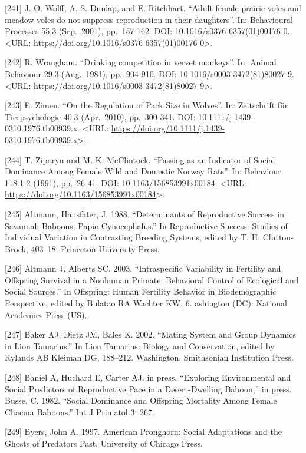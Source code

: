 \documentclass[
]{article}
\begin{document}
{[}241{]} J. O. Wolff, A. S. Dunlap, and E. Ritchhart. ``Adult female
prairie voles and meadow voles do not suppress reproduction in their
daughters''. In: Behavioural Processes 55.3 (Sep.~2001), pp.~157-162.
DOI: 10.1016/s0376-6357(01)00176-0. \textless URL:
\url{https://doi.org/10.1016/s0376-6357(01)00176-0}\textgreater.

{[}242{]} R. Wrangham. ``Drinking competition in vervet monkeys''. In:
Animal Behaviour 29.3 (Aug.~1981), pp.~904-910. DOI:
10.1016/s0003-3472(81)80027-9. \textless URL:
\url{https://doi.org/10.1016/s0003-3472(81)80027-9}\textgreater.

{[}243{]} E. Zimen. ``On the Regulation of Pack Size in Wolves''. In:
Zeitschrift für Tierpsychologie 40.3 (Apr.~2010), pp.~300-341. DOI:
10.1111/j.1439-0310.1976.tb00939.x. \textless URL:
\url{https://doi.org/10.1111/j.1439-0310.1976.tb00939.x}\textgreater.

{[}244{]} T. Ziporyn and M. K. McClintock. ``Passing as an Indicator of
Social Dominance Among Female Wild and Domestic Norway Rats''. In:
Behaviour 118.1-2 (1991), pp.~26-41. DOI: 10.1163/156853991x00184.
\textless URL:
\url{https://doi.org/10.1163/156853991x00184}\textgreater.

{[}245{]} Altmann, Hausfater, J. 1988. ``Determinants of Reproductive
Success in Savannah Baboons, Papio Cynocephalus.'' In Reproductive
Success: Studies of Individual Variation in Contrasting Breeding
Systems, edited by T. H. Clutton-Brock, 403--18. Princeton University
Press.

{[}246{]} Altmann J, Alberts SC. 2003. ``Intraspecific Variability in
Fertility and Offspring Survival in a Nonhuman Primate: Behavioral
Control of Ecological and Social Sources.'' In Offspring: Human
Fertility Behavior in Biodemographic Perspective, edited by Bulatao RA
Wachter KW, 6. ashington (DC): National Academies Press (US).

{[}247{]} Baker AJ, Dietz JM, Bales K. 2002. ``Mating System and Group
Dynamics in Lion Tamarins.'' In Lion Tamarins: Biology and Conservation,
edited by Rylands AB Kleiman DG, 188--212. Washington, Smithsonian
Institution Press.

{[}248{]} Baniel A, Huchard E, Carter AJ. in press. ``Exploring
Environmental and Social Predictors of Reproductive Pace in a
Desert-Dwelling Baboon,'' in press. Busse, C. 1982. ``Social Dominance
and Offspring Mortality Among Female Chacma Baboons.'' Int J Primatol 3:
267.

{[}249{]} Byers, John A. 1997. American Pronghorn: Social Adaptations
and the Ghosts of Predators Past. University of Chicago Press.
\end{document}
